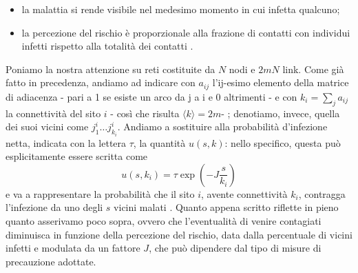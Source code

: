\begin{itemize}
	\item la malattia si rende visibile nel medesimo momento in cui infetta qualcuno;
	\item la percezione del rischio è proporzionale alla frazione di contatti con individui infetti rispetto alla totalità dei contatti \cite{Bagnoli2007}.
\end{itemize}
Poniamo la nostra attenzione su reti costituite da $ N $ nodi e $ 2mN $ link. Come già fatto in precedenza, andiamo ad indicare con $ a_{ij} $ l'ij-esimo elemento della matrice di adiacenza - pari a 1 se esiste un arco da j a i e $ 0 $ altrimenti - e con $ k_i = \sum_{j} a_{ij} $ la connettività del sito $ i $ - così che risulta $ \langle k \rangle = 2m $- ; denotiamo, invece, quella dei suoi vicini come $ j_{1}^i \dots j_{k_{i}}^i $. Andiamo a sostituire alla probabilità d'infezione netta, indicata con la lettera $ \tau $, la quantità $ u \left(s,k \right) $: nello specifico, questa può esplicitamente essere scritta come
\begin{equation}
	u \left(s,k_i \right) = \tau \exp(-J \frac{s}{k_i})
\end{equation}
e va a rappresentare la probabilità che il sito $ i $, avente connettività $ k_i $, contragga l'infezione da uno degli $ s $ vicini malati \cite{Bagnoli2014}. Quanto appena scritto riflette in pieno quanto asserivamo poco sopra, ovvero che l'eventualità di venire contagiati diminuisca in funzione della percezione del rischio, data dalla percentuale di vicini infetti e modulata da un fattore $ J $, che può dipendere dal tipo di misure di precauzione adottate.